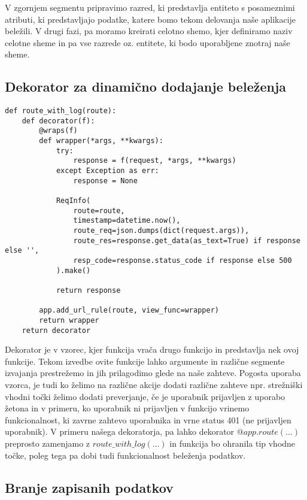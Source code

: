 \documentclass[a4paper,12pt,openright]{book}
\begin{document}
    \noindent
    V zgornjem segmentu pripravimo razred, ki predstavlja entiteto s posameznimi atributi, ki predstavljajo podatke, katere bomo tekom delovanja naše aplikacije beležili. V drugi fazi, pa moramo kreirati celotno shemo, kjer definiramo naziv celotne sheme in pa vse razrede oz. entitete, ki bodo uporabljene znotraj naše sheme.

    \newpage
    \subsection{Dekorator za dinamično dodajanje beleženja}

\begin{verbatim}
def route_with_log(route):
    def decorator(f):
        @wraps(f)
        def wrapper(*args, **kwargs):
            try:
                response = f(request, *args, **kwargs)
            except Exception as err:
                response = None

            ReqInfo(
                route=route,
                timestamp=datetime.now(),
                route_req=json.dumps(dict(request.args)),
                route_res=response.get_data(as_text=True) if response else '',
                resp_code=response.status_code if response else 500
            ).make()

            return response
        
        app.add_url_rule(route, view_func=wrapper)
        return wrapper
    return decorator
\end{verbatim}

    \noindent
    Dekorator je v vzorec, kjer funkcija vrača drugo funkcijo in predstavlja nek ovoj funkcije. Tekom izvedbe ovite funkcije lahko argumente in različne segmente izvajanja prestrežemo in jih prilagodimo glede na naše zahteve. Pogosta uporaba vzorca, je tudi ko želimo na različne akcije dodati različne zahteve npr. strežniški vhodni točki želimo dodati preverjanje, če je uporabnik prijavljen z uporabo žetona in v primeru, ko uporabnik ni prijavljen v funkcijo vrinemo funkcionalnost, ki zavrne zahtevo uporabnika in vrne status 401 (ne prijavljen uporabnik). V primeru našega dekoratorja, pa lahko dekorator $@app.route(...)$ preprosto zamenjamo z $route\_with\_log(...)$ in funkcija bo ohranila tip vhodne točke, poleg tega pa dobi tudi funkcionalnost beleženja podatkov.

    \subsection{Branje zapisanih podatkov}
\end{document}
